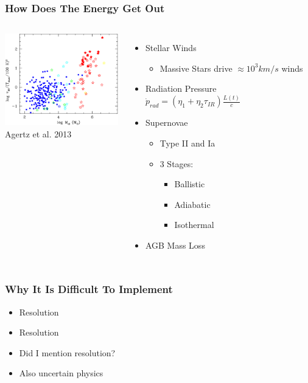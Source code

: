 \documentclass[serif,mathserif]{beamer}
\begin{document}
\begin{frame}
	\frametitle{How Does The Energy Get Out}
	\begin{columns}[c]
		\includegraphics[width=5cm]{figures/opticaldepth}\\
		\tiny{Agertz et al. 2013}
		\begin{itemize}
			\item Stellar Winds
				\begin{itemize}
					\item Massive Stars drive $\approx 10^3 km/s$ winds
				\end{itemize}
			\item Radiation Pressure $\dot p_{rad} = (\eta_1+\eta_2\tau_{IR})\frac{L(t)}{c}$
			\item Supernovae
				\begin{itemize}
					\item Type II and Ia
					\item 3 Stages:
					\begin{itemize}
						\item Ballistic
						\item Adiabatic
						\item Isothermal
					\end{itemize}
				\end{itemize}
			\item AGB Mass Loss
		\end{itemize}
	\end{columns}
\end{frame}

\begin{frame}
	\frametitle{Why It Is Difficult To Implement}
	\begin{itemize}
		\item Resolution
		\item Resolution
		\item Did I mention resolution?
		\item Also uncertain physics
	\end{itemize}
\end{frame}
\end{document}
